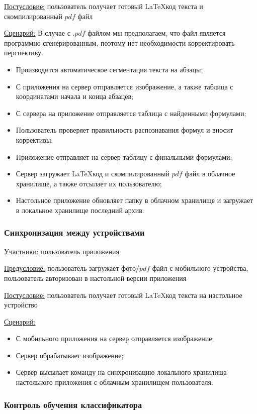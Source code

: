 \underline{Постусловие:} пользователь получает готовый \LaTeX\-код текста и скомпилированный $pdf$ файл

\underline{Сценарий:}
В случае с $.pdf$ файлом мы предполагаем, что файл является программно сгенерированным, поэтому нет необходимости корректировать перспективу.
\begin{itemize}
    \item Производится автоматическое сегментация текста на абзацы;
    \item С приложения на сервер отправляется изображение, а также таблица с координатами начала и конца абзацев;
    \item С сервера на приложение отправляется таблица с найденными формулами;
    \item Пользователь проверяет правильность распознавания формул и вносит коррективы;
    \item Приложение отправляет на сервер таблицу с финальными формулами;
    \item Сервер загружает \LaTeX\-код и скомпилированный $pdf$ файл в облачное хранилище, а также отсылает их пользователю;
    \item Настольное приложение обновляет папку в облачном хранилище и загружает в локальное хранилище последний архив.
\end{itemize}

\subsubsection{Синхронизация между устройствами}
\underline{Участники:} пользователь приложения

\underline{Предусловие:} пользователь загружает фото/$pdf$ файл с мобильного устройства, пользователь авторизован в настольной версии приложения

\underline{Постусловие:} пользователь получает готовый \LaTeX\-код текста на настольное устройство

\underline{Сценарий:}
\begin{itemize}
    \item С мобильного приложения на сервер отправляется изображение;
    \item Сервер обрабатывает изображение;
    \item Сервер высылает команду на синхронизацию локального хранилища настольного приложения с облачным хранилищем пользователя.
\end{itemize}

\subsubsection{Контроль обучения классификатора}


